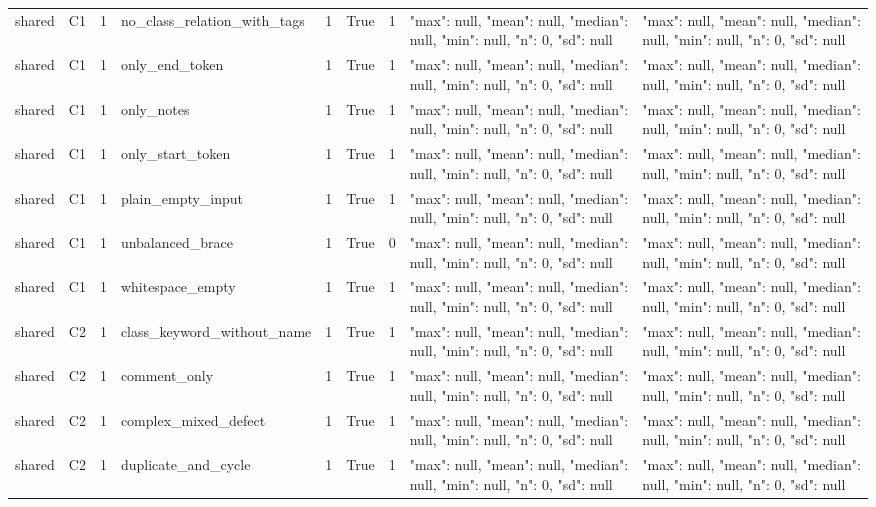 \begin{tabular}{lllllllll}
shared & C1 & 1 & no\_class\_relation\_with\_tags & 1 & True & 1 & {"max": null, "mean": null, "median": null, "min": null, "n": 0, "sd": null} & {"max": null, "mean": null, "median": null, "min": null, "n": 0, "sd": null} \\
shared & C1 & 1 & only\_end\_token & 1 & True & 1 & {"max": null, "mean": null, "median": null, "min": null, "n": 0, "sd": null} & {"max": null, "mean": null, "median": null, "min": null, "n": 0, "sd": null} \\
shared & C1 & 1 & only\_notes & 1 & True & 1 & {"max": null, "mean": null, "median": null, "min": null, "n": 0, "sd": null} & {"max": null, "mean": null, "median": null, "min": null, "n": 0, "sd": null} \\
shared & C1 & 1 & only\_start\_token & 1 & True & 1 & {"max": null, "mean": null, "median": null, "min": null, "n": 0, "sd": null} & {"max": null, "mean": null, "median": null, "min": null, "n": 0, "sd": null} \\
shared & C1 & 1 & plain\_empty\_input & 1 & True & 1 & {"max": null, "mean": null, "median": null, "min": null, "n": 0, "sd": null} & {"max": null, "mean": null, "median": null, "min": null, "n": 0, "sd": null} \\
shared & C1 & 1 & unbalanced\_brace & 1 & True & 0 & {"max": null, "mean": null, "median": null, "min": null, "n": 0, "sd": null} & {"max": null, "mean": null, "median": null, "min": null, "n": 0, "sd": null} \\
shared & C1 & 1 & whitespace\_empty & 1 & True & 1 & {"max": null, "mean": null, "median": null, "min": null, "n": 0, "sd": null} & {"max": null, "mean": null, "median": null, "min": null, "n": 0, "sd": null} \\
shared & C2 & 1 & class\_keyword\_without\_name & 1 & True & 1 & {"max": null, "mean": null, "median": null, "min": null, "n": 0, "sd": null} & {"max": null, "mean": null, "median": null, "min": null, "n": 0, "sd": null} \\
shared & C2 & 1 & comment\_only & 1 & True & 1 & {"max": null, "mean": null, "median": null, "min": null, "n": 0, "sd": null} & {"max": null, "mean": null, "median": null, "min": null, "n": 0, "sd": null} \\
shared & C2 & 1 & complex\_mixed\_defect & 1 & True & 1 & {"max": null, "mean": null, "median": null, "min": null, "n": 0, "sd": null} & {"max": null, "mean": null, "median": null, "min": null, "n": 0, "sd": null} \\
shared & C2 & 1 & duplicate\_and\_cycle & 1 & True & 1 & {"max": null, "mean": null, "median": null, "min": null, "n": 0, "sd": null} & {"max": null, "mean": null, "median": null, "min": null, "n": 0, "sd": null} \\

\end{tabular}
